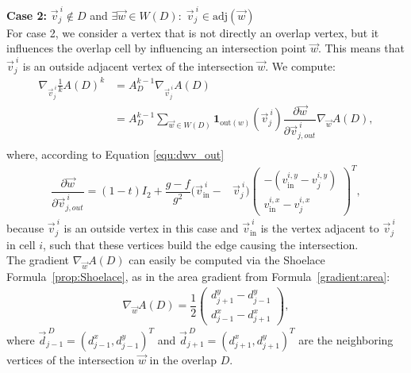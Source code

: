 \begin{proposition}
	\textbf{Case 2:} $\vec{v}_j^{\: i} \notin D$ and $\exists \vec{w} \in W(D): \; \vec{v}_j^{\: i} \in \text{adj}(\vec{w})$\\
	For case 2, we consider a vertex that is not directly an overlap vertex, but it influences the overlap cell by influencing an intersection point $\vec{w}$. 
	This means that $\vec{v}_j^{\: i}$ is an outside adjacent vertex of the intersection $\vec{w}$. 
	We compute:
	\begin{align*}
		\nabla_{\vec{v}_j^{\: i}} \frac{1}{k} A(D)^k 
		&= A_{D}^{k-1} \nabla_{\vec{v}_j^{\: i}} A(D) \\
		&= A_{D}^{k-1} \sum\limits_{\vec{w} \in W(D)} \mathbf{1}_{\text{out}(w)}(\vec{v}_{j}^{\: i}) \dfrac{\partial \vec{w}}{\partial \vec{v}_{j, out}^{\: i}}\nabla_{\vec{w}}A(D), \\
	\end{align*}
	where, according to Equation \ref{equ:dwv_out}
	\begin{align*}
		\dfrac{\partial \vec{w}}{\partial \vec{v}_{j, out}^{\: i}} = (1-t)I_2 + \dfrac{g - f}{g^2}(\vec{v}_{\text{in}}^{\: i} - &\vec{v}_j^{\: i}) \begin{pmatrix}
			-(v_{\text{in}}^{i, y} - v_{j}^{i, y}) \\[0.5em]
			 v_{\text{in}}^{i, x} - v_{j}^{i, x}
		\end{pmatrix}^T,
	\end{align*}
	because $\vec{v}_j^{\: i}$ is an outside vertex in this case and $\vec{v}_{\text{in}}^{\: i}$ is the vertex adjacent to $\vec{v}_j^{\: i}$ in cell $i$, such that these vertices build the edge causing the intersection. \\
	The gradient $\nabla_{\vec{w}}A(D)$ can easily be computed via the Shoelace Formula~\ref{prop:Shoelace}, as in the area gradient from Formula~\ref{gradient:area}:
	\begin{align*}
		\nabla_{\vec{w}}A(D) = \dfrac{1}{2} \begin{pmatrix} d_{j+1}^{y} - d_{j-1}^{y} \\[0.5em]  d_{j-1}^{x} - d_{j+1}^{x} \end{pmatrix},
	\end{align*}
	where $\vec{d}_{j-1}^{\: D} = (d_{j-1}^{x}, d_{j-1}^{y})^T$ and $\vec{d}_{j+1}^{\: D} = (d_{j+1}^{x}, d_{j+1}^{y})^T$ are the neighboring vertices of the intersection $\vec{w}$ in the overlap $D$.\\


\end{proposition}
